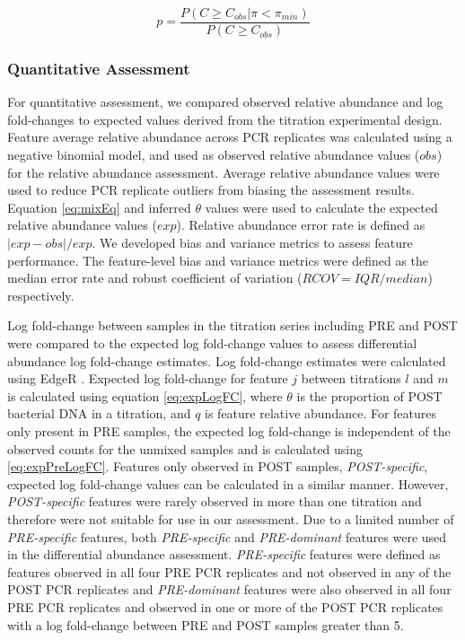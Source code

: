 \documentclass{bmcart}
\begin{document}
\begin{equation}
    p = \frac{P(C \geq C_{obs}| \pi < \pi_{min})}{P(C \geq C_{obs})}
  \label{eq:bht2}
\end{equation}



\subsubsection*{Quantitative Assessment}
For quantitative assessment, we compared observed relative abundance and
log fold-changes to expected values derived from the titration
experimental design.
Feature average relative abundance across PCR
replicates was calculated using a negative binomial model, and used as
observed relative abundance values (\(obs\)) for the relative abundance
assessment. Average relative abundance values were used to reduce PCR
replicate outliers from biasing the assessment results. Equation
\eqref{eq:mixEq} and inferred \(\theta\) values were used to calculate the
expected relative abundance values (\(exp\)). Relative abundance error
rate is defined as \(|exp - obs|/exp\).
We developed bias and variance metrics to assess feature performance.
The feature-level bias and variance metrics were defined as the median
error rate and robust coefficient of variation (\(RCOV=IQR/median\))
respectively.

Log fold-change between samples in the titration series including PRE
and POST were compared to the expected log fold-change values to assess
differential abundance log fold-change estimates. Log fold-change
estimates were calculated using EdgeR
\cite{Robinson2010, McCarthy2012}. Expected log fold-change for feature
\(j\) between titrations \(l\) and \(m\) is calculated using equation
\eqref{eq:expLogFC}, where \(\theta\) is the proportion of POST bacterial
DNA in a titration, and \(q\) is feature relative abundance. For
features only present in PRE samples, the expected log fold-change is
independent of the observed counts for the unmixed samples and is
calculated using \eqref{eq:expPreLogFC}. Features only observed in POST
samples, \emph{POST-specific}, expected log fold-change values can be
calculated in a similar manner. However, \emph{POST-specific} features
were rarely observed in more than one titration and therefore were not
suitable for use in our assessment. Due to a limited number of
\emph{PRE-specific} features, both \emph{PRE-specific} and
\emph{PRE-dominant} features were used in the differential abundance
assessment. \emph{PRE-specific} features were defined as features
observed in all four PRE PCR replicates and not observed in any of the
POST PCR replicates and \emph{PRE-dominant} features were also observed
in all four PRE PCR replicates and observed in one or more of the POST
PCR replicates with a log fold-change between PRE and POST samples
greater than 5.
\end{document}
